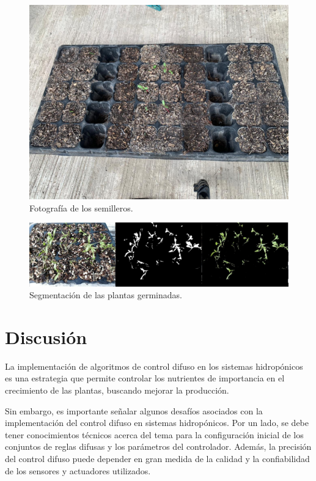 \begin{figure}[H]
\centering
         \includegraphics[scale=0.2]{imgs/fotoCamara.jpg}
    \caption{Fotografía de los semilleros.}\label{foto}
\end{figure}

\begin{figure}[H]
\centering
         \includegraphics[scale=0.35]{imgs/germinacion.jpeg}
    \caption{Segmentación de las plantas germinadas.}\label{segmentacion}
\end{figure}

\section{Discusión}
La implementación de algoritmos de control difuso en los sistemas hidropónicos es una estrategia que permite controlar los nutrientes de importancia en el crecimiento de las plantas, buscando mejorar la producción.

Sin embargo, es importante señalar algunos desafíos asociados con la implementación del control difuso en sistemas hidropónicos. Por un lado, se debe tener conocimientos técnicos acerca del tema para la configuración inicial de los conjuntos de reglas difusas y los parámetros del controlador. Además, la precisión del control difuso puede depender en gran medida de la calidad y la confiabilidad de los sensores y actuadores utilizados.

